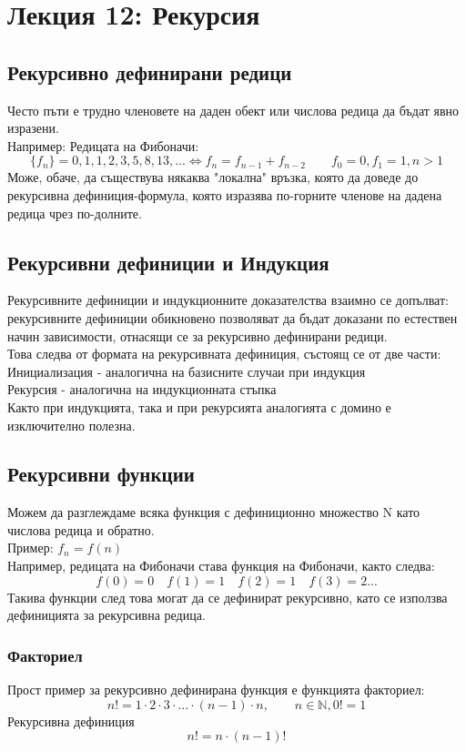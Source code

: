 \documentclass[fleqn, 12pt]{article}
\theoremstyle{definition}
\begin{document}
\newpage
\section{Лекция 12: Рекурсия}

\subsection{Рекурсивно дефинирани редици}
Често пъти е трудно членовете на даден обект или числова редица да бъдат явно изразени. \\
Например: Редицата на Фибоначи:
$$\{f_n\} = 0,1,1,2,3,5,8,13, ... \Leftrightarrow  f_n = f_{n-1} + f_{n-2} \qquad f_0 = 0, f_1 = 1,  n>1$$
Може, обаче, да съществува някаква "локална" връзка, която да доведе до рекурсивна дефиниция-формула, която изразява по-горните членове на дадена редица чрез по-долните.

\subsection{Рекурсивни дефиниции и Индукция}
Рекурсивните дефиниции и индукционните доказателства взаимно се допълват:  рекурсивните дефиниции обикновено позволяват да бъдат доказани по естествен начин зависимости, отнасящи се за рекурсивно дефинирани редици. \\
Това следва от формата на рекурсивната дефиниция, състоящ се от две части:\\
Инициализация - аналогична на базисните случаи при индукция\\
Рекурсия - аналогична на индукционната стъпка \\
Както при индукцията, така и при рекурсията аналогията с домино е изключително полезна.

\subsection{Рекурсивни функции}
Можем да разглеждаме всяка функция с дефиниционно множество N като числова редица и обратно. \\
Пример: $f_n=f (n)$\\
Например, редицата на Фибоначи става функция на Фибоначи, както следва:
$$f(0) = 0 \quad f(1) = 1 \quad f(2) = 1 \quad f(3) = 2 ...$$
Такива функции след това могат да се дефинират рекурсивно, като се използва дефиницията за рекурсивна редица. 

\subsubsection{Факториел}
Прост пример за рекурсивно дефинирана функция е функцията факториел: 
$$n! = 1 \cdot 2 \cdot 3 \cdot ... \cdot (n-1) \cdot n, \qquad n \in \mathbb{N}, 0! = 1$$
Рекурсивна дефиниция
$$n! = n \cdot (n-1)!$$
\end{document}
